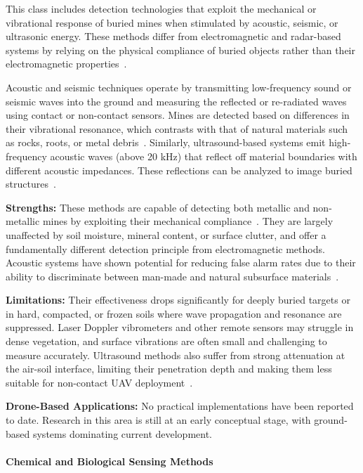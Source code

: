 This class includes detection technologies that exploit the mechanical or vibrational response of buried mines when stimulated by acoustic, seismic, or ultrasonic energy. These methods differ from electromagnetic and radar-based systems by relying on the physical compliance of buried objects rather than their electromagnetic properties~\cite{Gooneratne2004ARO,gichd2006guidebook}.

Acoustic and seismic techniques operate by transmitting low-frequency sound or seismic waves into the ground and measuring the reflected or re-radiated waves using contact or non-contact sensors. Mines are detected based on differences in their vibrational resonance, which contrasts with that of natural materials such as rocks, roots, or metal debris~\cite{gichd2006guidebook}. Similarly, ultrasound-based systems emit high-frequency acoustic waves (above 20 kHz) that reflect off material boundaries with different acoustic impedances. These reflections can be analyzed to image buried structures~\cite{paik2002image,cardonalandmine}.

\textbf{Strengths:} These methods are capable of detecting both metallic and non-metallic mines by exploiting their mechanical compliance~\cite{Gooneratne2004ARO}. They are largely unaffected by soil moisture, mineral content, or surface clutter, and offer a fundamentally different detection principle from electromagnetic methods. Acoustic systems have shown potential for reducing false alarm rates due to their ability to discriminate between man-made and natural subsurface materials~\cite{gichd2006guidebook}.

\textbf{Limitations:} Their effectiveness drops significantly for deeply buried targets or in hard, compacted, or frozen soils where wave propagation and resonance are suppressed. Laser Doppler vibrometers and other remote sensors may struggle in dense vegetation, and surface vibrations are often small and challenging to measure accurately. Ultrasound methods also suffer from strong attenuation at the air-soil interface, limiting their penetration depth and making them less suitable for non-contact UAV deployment~\cite{Gooneratne2004ARO,cardonalandmine}.

\textbf{Drone-Based Applications:} No practical implementations have been reported to date. Research in this area is still at an early conceptual stage, with ground-based systems dominating current development.

\paragraph{Chemical and Biological Sensing Methods}

